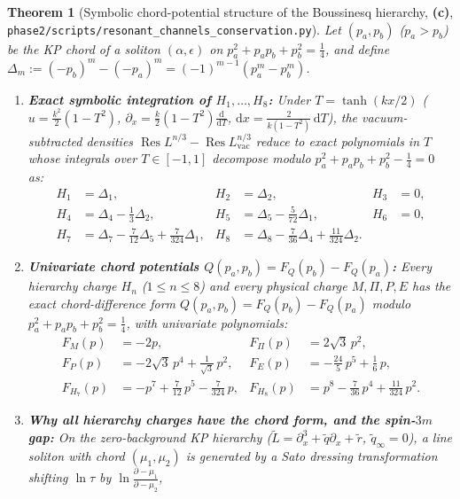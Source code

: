 \documentclass[11pt,a4paper]{article}
\newcommand{\Lc}{\textsf{\textbf{(c)}}\xspace}
\newcommand{\dd}{\mathrm{d}}
\newcommand{\Res}{\operatorname{Res}}
\newcommand{\scons}{\texttt{phase2/\allowbreak scripts/\allowbreak resonant\_\allowbreak channels\_\allowbreak conservation.py}}
\newtheorem{theorem}[proposition]{Theorem}
\theoremstyle{remark}
\begin{document}
\begin{theorem}[Symbolic chord-potential structure of the Boussinesq hierarchy, \Lc, \scons]\label{thm:chord_charges}
Let $(p_a,p_b)$ ($p_a > p_b$) be the KP chord of a soliton $(\alpha,\epsilon)$ on
$p_a^2 + p_a p_b + p_b^2 = \frac{1}{4}$, and define
$\Delta_m := (-p_b)^m - (-p_a)^m = (-1)^{m-1}(p_a^m - p_b^m)$.
\begin{enumerate}
\item \textbf{Exact symbolic integration of $H_1,\dots,H_8$:}
Under $T = \tanh(kx/2)$ ($u = \frac{k^2}{2}(1-T^2)$,
$\partial_x = \frac{k}{2}(1-T^2)\frac{\dd}{\dd T}$,
$\dd x = \frac{2}{k(1-T^2)}\,\dd T$), the vacuum-subtracted densities
$\Res L^{n/3} - \Res L_{\mathrm{vac}}^{n/3}$ reduce to exact polynomials in $T$
whose integrals over $T \in [-1,1]$ decompose modulo
$p_a^2 + p_a p_b + p_b^2 - \frac{1}{4} = 0$ as:
\begin{align}
  H_1 &= \Delta_1, &
  H_2 &= \Delta_2, &
  H_3 &= 0, \nonumber\\
  H_4 &= \Delta_4 - \frac{1}{3}\Delta_2, &
  H_5 &= \Delta_5 - \frac{5}{72}\Delta_1, &
  H_6 &= 0, \label{eq:H1_to_H8}\\
  H_7 &= \Delta_7 - \frac{7}{12}\Delta_5 + \frac{7}{324}\Delta_1, &
  H_8 &= \Delta_8 - \frac{7}{36}\Delta_4 + \frac{11}{324}\Delta_2. \nonumber
\end{align}
\item \textbf{Univariate chord potentials $Q(p_a,p_b) = F_Q(p_b) - F_Q(p_a)$:}
Every hierarchy charge $H_n$ ($1\le n\le 8$) and every physical charge
$M,\Pi,P,E$ has the exact chord-difference form $Q(p_a,p_b) = F_Q(p_b) - F_Q(p_a)$
modulo $p_a^2 + p_a p_b + p_b^2 = \frac{1}{4}$, with univariate polynomials:
\begin{align}
  F_M(p) &= -2p, &
  F_\Pi(p) &= 2\sqrt{3}\,p^2, \nonumber\\
  F_P(p) &= -2\sqrt{3}\,p^4 + \frac{1}{\sqrt{3}}\,p^2, &
  F_E(p) &= -\frac{24}{5}\,p^5 + \frac{1}{6}\,p, \label{eq:F_potentials}\\
  F_{H_7}(p) &= -p^7 + \frac{7}{12}\,p^5 - \frac{7}{324}\,p, &
  F_{H_8}(p) &= p^8 - \frac{7}{36}\,p^4 + \frac{11}{324}\,p^2. \nonumber
\end{align}
\item \textbf{Why all hierarchy charges have the chord form, and the spin-$3m$ gap:}
On the zero-background KP hierarchy ($\tilde{L} = \partial_x^3 + \tilde{q}\partial_x + \tilde{r}$,
$\tilde{q}_\infty = 0$), a line soliton with chord $(\mu_1,\mu_2)$ is generated
by a Sato dressing transformation shifting $\ln\tau$ by $\ln\frac{\partial-\mu_1}{\partial-\mu_2}$,

\end{enumerate}
\end{theorem}
\end{document}
